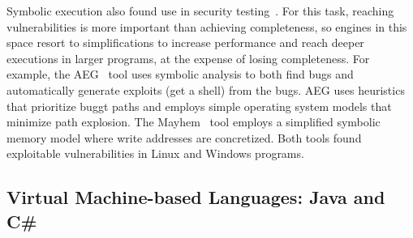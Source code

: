 

Symbolic execution also found use in security testing~\cite{aeg,mayhem,bitBlaze}.  For this task, reaching vulnerabilities is more important than achieving completeness, so engines in this space resort to simplifications to increase performance and reach deeper executions in larger programs, at the expense of losing completeness.
%
For example, the AEG~\cite{aeg} tool uses symbolic analysis to both find bugs and automatically generate exploits (get a shell) from the bugs.  AEG uses heuristics that prioritize buggt paths and employs simple operating system models that minimize path explosion.
%
The Mayhem~\cite{mayhem} tool employs a simplified symbolic memory model where write addresses are concretized.
%
Both tools found exploitable vulnerabilities in Linux and Windows programs.


\subsection{Virtual Machine-based Languages: Java and C\#}



